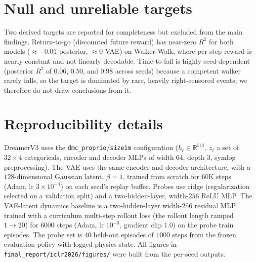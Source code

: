 \documentclass{article} %
\newcommand{\rtwo}{\ensuremath{R^2}}
\begin{document}
\section{Null and unreliable targets}
\label{app:nulls}
Two derived targets are reported for completeness but excluded from the main
findings. Return-to-go (discounted future reward) has near-zero \rtwo{} for both
models ($\approx-0.01$ posterior, $\approx0$ VAE) on Walker-Walk, where per-step
reward is nearly constant and not linearly decodable. Time-to-fall is highly
seed-dependent (posterior \rtwo{} of $0.06$, $0.50$, and $0.98$ across seeds)
because a competent walker rarely falls, so the target is dominated by rare,
heavily right-censored events; we therefore do not draw conclusions from it.

\section{Reproducibility details}
DreamerV3 uses the \texttt{dmc\_proprio}/\texttt{size1m} configuration
($h_t\in\mathbb{R}^{512}$, $z_t$ a set of $32{\times}4$ categoricals,
encoder and decoder MLPs of width $64$, depth $3$, symlog preprocessing). The
VAE uses the same encoder and decoder architecture, with a $128$-dimensional Gaussian
latent, $\beta{=}1$, trained from scratch for $60$K steps (Adam, lr
$3\times10^{-4}$) on each seed's replay buffer. Probes use ridge
(regularization selected on a validation split) and a two-hidden-layer,
width-$256$ ReLU MLP. The VAE-latent dynamics baseline is a two-hidden-layer
width-$256$ residual MLP trained with a curriculum multi-step rollout loss (the
rollout length ramped $1\to20$) for $6000$ steps (Adam, lr $10^{-3}$, gradient
clip $1.0$) on the probe train episodes. The probe set is $40$ held-out episodes
of $1000$ steps from the frozen evaluation policy with logged physics state. All
figures in \texttt{final\_report/iclr2026/figures/} were built from the
per-seed outputs.
\end{document}
